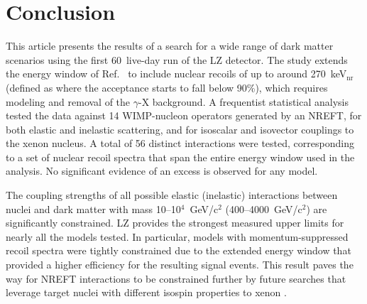 \documentclass[reprint, showpacs,
preprintnumbers,
amsmath,amssymb,
aps, floatfix,
superscriptaddress,
prd, nofootinbib]{revtex4-1}
\begin{document}
\section{\label{sec:conclusion}Conclusion}
This article presents the results of a search for a wide range of dark matter scenarios using the first 60~live-day run of the LZ detector.
The study extends the energy window of Ref.~\cite{LZ:SR1WS_2022} to include nuclear recoils of up to around 270~keV$_\text{nr}$ (defined as where the acceptance starts to fall below 90\%), which requires modeling and removal of the $\gamma$-X background.
A frequentist statistical analysis tested the data against 14 WIMP-nucleon operators generated by an NREFT, for both elastic and inelastic scattering, and for isoscalar and isovector couplings to the xenon nucleus.
A total of 56 distinct interactions were tested, corresponding to a set of nuclear recoil spectra that span the entire energy window used in the analysis.
No significant evidence of an excess is observed for any model.

The coupling strengths of all possible elastic (inelastic) interactions between nuclei and dark matter with mass 10--10$^4$~GeV/c$^2$ (400--4000~GeV/c$^2$) are significantly constrained.
LZ provides the strongest measured upper limits for nearly all the models tested.
In particular, models with momentum-suppressed recoil spectra were tightly constrained due to the extended energy window that provided a higher efficiency for the resulting signal events. 
This result paves the way for NREFT interactions to be constrained further by future searches that leverage target nuclei with different isospin properties to xenon \cite{schneck2015dark}. 
\end{document}
